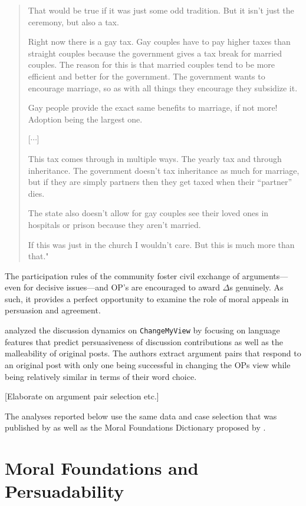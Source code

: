 \begin{quote}\singlespacing
That would be true if it was just some odd tradition. But it isn't just the ceremony, but also a tax.

Right now there is a gay tax. Gay couples have to pay higher taxes than straight couples because the government gives a tax break for married couples. The reason for this is that married couples tend to be more efficient and better for the government. The government wants to encourage marriage, so as with all things they encourage they subsidize it.

Gay people provide the exact same benefits to marriage, if not more! Adoption being the largest one.

[\hspace{.2em}$\cdots$]

This tax comes through in multiple ways. The yearly tax and through inheritance. The government doesn't tax inheritance as much for marriage, but if they are simply partners then they get taxed when their ``partner'' dies.

The state also doesn't allow for gay couples see their loved ones in hospitals or prison because they aren't married.

If this was just in the church I wouldn't care. But this is much more than that."
\end{quote}
The participation rules of the community foster civil exchange of arguments---even for decisive issues---and OP's are encouraged to award \(\Delta\)s genuinely. As such, it provides a perfect opportunity to examine the role of moral appeals in persuasion and agreement.

\citet{tan2016winning} analyzed the discussion dynamics on \texttt{ChangeMyView} by focusing on language features that predict persuasiveness of discussion contributions as well as the malleability of original posts. The authors extract argument pairs that respond to an original post with only one being successful in changing the OPs view while being relatively similar in terms of their word choice.

{[}Elaborate on argument pair selection etc.{]}

The analyses reported below use the same data and case selection that was published by \citet{tan2016winning} as well as the Moral Foundations Dictionary proposed by \citet{graham2009liberals}.

\section{Moral Foundations and Persuadability}\label{moral-foundations-and-persuadability}

